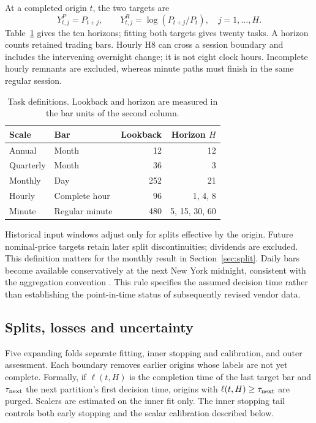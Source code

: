 At a completed origin \(t\), the two targets are
\[
Y^P_{t,j}=P_{t+j},\qquad
Y^R_{t,j}=\log(P_{t+j}/P_t),\quad j=1,\ldots,H.
\]
Table~\ref{tab:design} gives the ten horizons; fitting both targets gives twenty tasks. A horizon counts retained trading bars. Hourly H8 can cross a session boundary and includes the intervening overnight change; it is not eight clock hours. Incomplete hourly remnants are excluded, whereas minute paths must finish in the same regular session.

\begin{table}[t]
\centering\small
\caption{Task definitions. Lookback and horizon are measured in the bar units of the second column.}\label{tab:design}
\setlength{\tabcolsep}{4pt}
\begin{tabular}{llrr}\toprule
Scale & Bar & Lookback & Horizon \(H\)\\\midrule
Annual & Month & 12 & 12\\
Quarterly & Month & 36 & 3\\
Monthly & Day & 252 & 21\\
Hourly & Complete hour & 96 & 1, 4, 8\\
Minute & Regular minute & 480 & 5, 15, 30, 60\\\bottomrule
\end{tabular}
\end{table}

Historical input windows adjust only for splits effective by the origin. Future nominal-price targets retain later split discontinuities; dividends are excluded. This definition matters for the monthly result in Section~\ref{sec:split}. Daily bars become available conservatively at the next New York midnight, consistent with the aggregation convention \cite{r12}. This rule specifies the assumed decision time rather than establishing the point-in-time status of subsequently revised vendor data.

\subsection{Splits, losses and uncertainty}

Five expanding folds separate fitting, inner stopping and calibration, and outer assessment. Each boundary removes earlier origins whose labels are not yet complete. Formally, if \(\ell(t,H)\) is the completion time of the last target bar and \(\tau_{\rm next}\) the next partition's first decision time, origins with \(\ell(t,H)\geq\tau_{\rm next}\) are purged. Scalers are estimated on the inner fit only. The inner stopping tail controls both early stopping and the scalar calibration described below.

